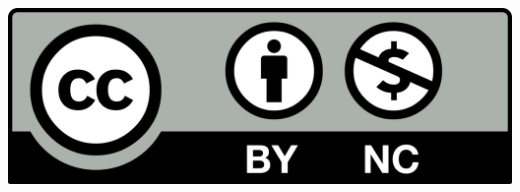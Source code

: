   \href{https://creativecommons.org/licenses/by-nc/4.0/}{
    \includegraphics[scale=0.1]{license}
  }

  


